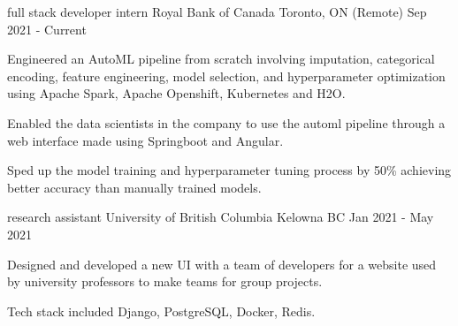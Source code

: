

\begin{cventries}

  \cventry
    {full stack developer intern} %
    {Royal Bank of Canada} %
    {Toronto, ON (Remote)} %
    {Sep 2021 - Current} %
    {
      \begin{cvitems} %
        \item {Engineered an AutoML pipeline from scratch involving imputation, categorical encoding, feature engineering, model selection, and hyperparameter optimization using Apache Spark, Apache Openshift, Kubernetes and H2O.} 
        \item {Enabled the data scientists in the company to use the automl pipeline through a web interface made using Springboot and Angular.} 
        \item {Sped up the model training and hyperparameter tuning process by 50\% achieving better accuracy than manually trained models.} 
      \end{cvitems}
    }



  \cventry
    {research assistant} %
    {University of British Columbia} %
    {Kelowna BC} %
    {Jan 2021 - May 2021} %
    {
      \begin{cvitems} %
        \item {Designed and developed a new UI with a team of developers for a website used by university professors to make teams for group projects.} 
        \item {} 
        \item {Tech stack included Django, PostgreSQL, Docker, Redis.}
      \end{cvitems}
    }


\end{cventries}
